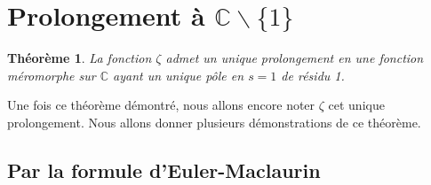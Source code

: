 \documentclass[french]{report}
\newtheorem{theorem}{Théorème}[section]
\begin{document}
\section{Prolongement à $\mathbb{C}\backslash\{1\}$}

\begin{theorem}
  La fonction $\zeta$ admet un unique prolongement en une fonction méromorphe sur $\mathbb{C}$ ayant un unique pôle en $s=1$ de résidu 1.
\end{theorem}

Une fois ce théorème démontré, nous allons encore noter $\zeta$ cet unique prolongement. Nous allons donner plusieurs démonstrations de ce théorème.

\subsection{Par la formule d'Euler-Maclaurin}
\end{document}
